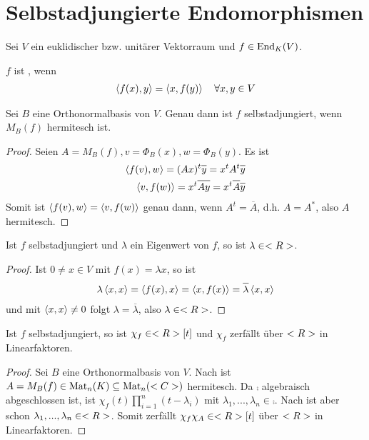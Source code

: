 \section{Selbstadjungierte Endomorphismen}

Sei $V$ ein euklidischer bzw. unitärer Vektorraum und $f\in\operatorname{End}_K(V)$.

\begin{definition}[selbstadjungiert]
	$f$ ist , wenn
	\begin{align}
		\left\langle f(x),y\right\rangle=\left\langle x,f(y)\right\rangle\quad\forall x,y\in V\notag
	\end{align}
\end{definition}

\begin{proposition}
	Sei $B$ eine Orthonormalbasis von $V$. Genau dann ist $f$ selbstadjungiert, wenn $M_B(f)$ hermitesch ist.
\end{proposition}
\begin{proof}
	Seien $A=M_B(f),v=\Phi_B(x),w=\Phi_B(y)$. Es ist 
	\begin{align}
		\skalar{f(v)}{w}=(Ax)^t\overline{y}=x^tA^t\overline{y}\notag \\
		\skalar{v}{f(w)}=x^t\overline{Ay}=x^t\overline{A}\overline{y}\notag
	\end{align}
	Somit ist $\left\langle f(v),w\right\rangle=\left\langle v,f(w)\right\rangle$ genau dann, wenn $A^t=\overline{A}$, d.h. $A=A^*$, also $A$ hermitesch.
\end{proof}

\begin{lemma}
	Ist $f$ selbstadjungiert und $\lambda$ ein Eigenwert von $f$, so ist $\lambda\in<R>$.
\end{lemma}
\begin{proof}
	Ist $0\neq x\in V$ mit $f(x)=\lambda x$, so ist 
	\begin{align}
		\lambda\skalar{x}{x}=\skalar{f(x)}{x}=\skalar{x}{f(x)}=\overline{\lambda}\skalar{x}{x}\notag
	\end{align}
	und mit $\left\langle x,x\right\rangle\neq 0$ folgt $\lambda=\overline{\lambda}$, also $\lambda\in<R>$.
\end{proof}

\begin{proposition}
	Ist $f$ selbstadjungiert, so ist $\chi_f\in<R>[t]$ und $\chi_f$ zerfällt über $<R>$ in Linearfaktoren.
\end{proposition}
\begin{proof}
	Sei $B$ eine Orthonormalbasis von $V$. Nach  ist $A=M_B(f)\in\operatorname{Mat}_n(K)\subseteq \operatorname{Mat}_n(<C>)$ hermitesch. Da $\comp$ algebraisch abgeschlossen ist, ist $\chi_f(t)\prod_{i=1}^{n} (t-\lambda_i)$ mit $\lambda_1,...,\lambda_n\in\comp$. Nach  ist aber schon $\lambda_1,...,\lambda_n\in<R>$. Somit zerfällt $\chi_f\chi_A\in<R>[t]$ über $<R>$ in Linearfaktoren.
\end{proof}


